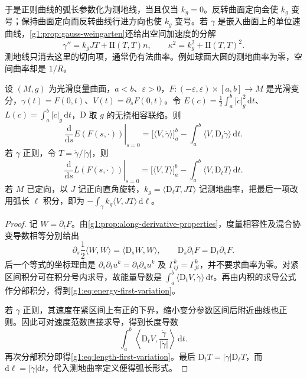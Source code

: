 于是正则曲线的弧长参数化为测地线，当且仅当 \(k_g=0\)。反转曲面定向会使 \(k_g\) 变号；保持曲面定向而反转曲线行进方向也使 \(k_g\) 变号。若 \(\gamma\) 是嵌入曲面上的单位速曲线，\cref{g1:prop:gauss-weingarten}还给出空间加速度的分解
\begin{equation}
	\label{g1:eq:geodesic-normal-curvature}
	\gamma''=k_gJT+\mathrm{II}(T,T)n,
	\qquad \kappa^2=k_g^2+\mathrm{II}(T,T)^2.
\end{equation}
测地线只消去这里的切向项，通常仍有法曲率。例如球面大圆的测地曲率为零，空间曲率却是 \(1/R\)。

\begin{proposition}
	\label{g1:prop:first-variation}
	设 \((M,g)\) 为光滑度量曲面，\(a<b\)、\(\varepsilon>0\)，\(F:(-\varepsilon,\varepsilon)\times[a,b]\to M\) 是光滑变分，\(\gamma(t)=F(0,t)\)、\(V(t)=\partial_sF(0,t)\)。令 \(E(c)=\tfrac12\int_a^b|\dot c|_g^2\,\mathrm dt\)、\(L(c)=\int_a^b|\dot c|_g\,\mathrm dt\)，\(\mathrm D\) 取 \(g\) 的无挠相容联络。则
	\begin{equation}
		\label{g1:eq:energy-first-variation}
		\left.\frac{\mathrm{d}}{\mathrm{d}s}E(F(s,\cdot))\right|_{s=0}
		=\bigl[\langle V,\dot\gamma\rangle\bigr]_a^b-\int_a^b\langle V,\mathrm{D}_t\dot\gamma\rangle\,\mathrm{d}t.
	\end{equation}
	若 \(\gamma\) 正则，令 \(T=\dot\gamma/|\dot\gamma|\)，则
	\begin{equation}
		\label{g1:eq:length-first-variation}
		\left.\frac{\mathrm{d}}{\mathrm{d}s}L(F(s,\cdot))\right|_{s=0}
		=\bigl[\langle V,T\rangle\bigr]_a^b-\int_a^b\langle V,\mathrm{D}_tT\rangle\,\mathrm{d}t.
	\end{equation}
	若 \(M\) 已定向，以 \(J\) 记正向直角旋转，\(k_g=\langle\mathrm D_\ell T,JT\rangle\) 记测地曲率，把最后一项改用弧长 \(\ell\) 积分，即为 \(-\int_\gamma k_g\langle V,JT\rangle\,\mathrm{d}\ell\)。
\end{proposition}
\begin{proof}
	记 \(W=\partial_tF\)。由\cref{g1:prop:along-derivative-properties}，度量相容性及混合协变导数相等分别给出
	\[
		\partial_s\frac12\langle W,W\rangle=\langle \mathrm{D}_sW,W\rangle,
		\qquad \mathrm{D}_s\partial_tF=\mathrm{D}_t\partial_sF.
	\]
	后一个等式的坐标理由是 \(\partial_s\partial_tu^k=\partial_t\partial_su^k\) 及 \(\Gamma^k_{ij}=\Gamma^k_{ji}\)，并不要求曲率为零。对紧区间积分可在积分号内求导，故能量导数是 \(\int_a^b\langle \mathrm{D}_tV,\dot\gamma\rangle\,\mathrm{d}t\)。再由内积的求导公式作分部积分，得到\eqref{g1:eq:energy-first-variation}。

	若 \(\gamma\) 正则，其速度在紧区间上有正的下界，缩小变分参数区间后附近曲线也正则。因此可对速度范数直接求导，得到长度导数
	\[
		\int_a^b\left\langle \mathrm{D}_tV,\frac{\dot\gamma}{|\dot\gamma|}\right\rangle\,\mathrm{d}t.
	\]
	再次分部积分即得\eqref{g1:eq:length-first-variation}。最后 \(\mathrm{D}_tT=|\dot\gamma|\mathrm{D}_\ell T\)，而 \(\mathrm{d}\ell=|\dot\gamma|\mathrm{d}t\)，代入测地曲率定义便得弧长形式。
\end{proof}

